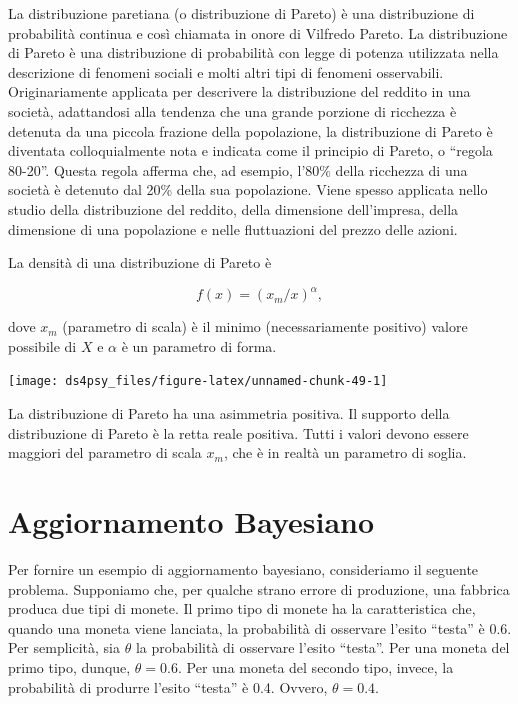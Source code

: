 \documentclass[
  11pt,
]{krantz}
\theoremstyle{definition}
\theoremstyle{definition}
\theoremstyle{definition}
\theoremstyle{definition}
\theoremstyle{remark}
\begin{document}
La distribuzione paretiana (o distribuzione di Pareto) è una distribuzione di probabilità continua e così chiamata in onore di Vilfredo Pareto. La distribuzione di Pareto è una distribuzione di probabilità con legge di potenza utilizzata nella descrizione di fenomeni sociali e molti altri tipi di fenomeni osservabili. Originariamente applicata per descrivere la distribuzione del reddito in una società, adattandosi alla tendenza che una grande porzione di ricchezza è detenuta da una piccola frazione della popolazione, la distribuzione di Pareto è diventata colloquialmente nota e indicata come il principio di Pareto, o ``regola 80-20''. Questa regola afferma che, ad esempio, l'80\% della ricchezza di una società è detenuto dal 20\% della sua popolazione. Viene spesso applicata nello studio della distribuzione del reddito, della dimensione dell'impresa, della dimensione di una popolazione e nelle fluttuazioni del prezzo delle azioni.

La densità di una distribuzione di Pareto è

\[
f(x)=(x_m/x)^\alpha,
\]

dove \(x_m\) (parametro di scala) è il minimo (necessariamente positivo) valore possibile di \(X\) e \(\alpha\) è un parametro di forma.

\begin{center}\texttt{[image: ds4psy\_files/figure-latex/unnamed-chunk-49-1]} \end{center}

\noindent La distribuzione di Pareto ha una asimmetria positiva. Il supporto della distribuzione di Pareto è la retta reale positiva. Tutti i valori devono essere maggiori del parametro di scala \(x_m\), che è in realtà un parametro di soglia.

\hypertarget{appendix:bayes-updating}{%
\chapter{Aggiornamento Bayesiano}\label{appendix:bayes-updating}}

Per fornire un esempio di aggiornamento bayesiano, consideriamo il seguente problema. Supponiamo che, per qualche strano errore di produzione, una fabbrica produca due tipi di monete. Il primo tipo di monete ha la caratteristica che, quando una moneta viene lanciata, la probabilità di osservare l'esito ``testa'' è 0.6. Per semplicità, sia \(\theta\) la probabilità di osservare l'esito ``testa''. Per una moneta del primo tipo, dunque, \(\theta = 0.6\). Per una moneta del secondo tipo, invece, la probabilità di produrre l'esito ``testa'' è 0.4. Ovvero, \(\theta = 0.4\).
\end{document}
